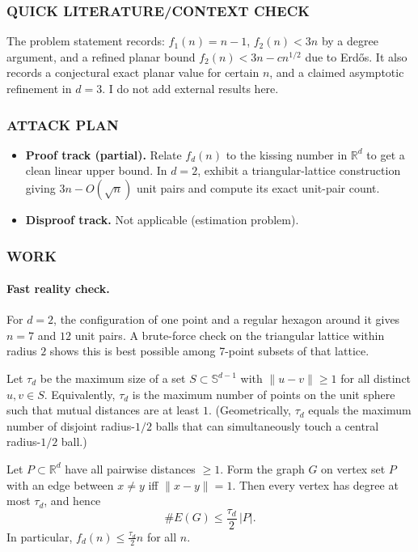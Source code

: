 \subsubsection*{QUICK LITERATURE/CONTEXT CHECK}
The problem statement records: \(f_1(n)=n-1\), \(f_2(n)<3n\) by a degree argument, and a refined planar bound
\(f_2(n)<3n-c n^{1/2}\) due to Erd\H{o}s. It also records a conjectural exact planar value for certain \(n\), and a claimed asymptotic refinement in \(d=3\).
I do not add external results here.

\subsubsection*{ATTACK PLAN}
\begin{itemize}
\item \textbf{Proof track (partial).} Relate \(f_d(n)\) to the kissing number in \(\mathbb{R}^d\) to get a clean linear upper bound. In \(d=2\), exhibit a triangular-lattice construction giving \(3n-O(\sqrt n)\) unit pairs and compute its exact unit-pair count.
\item \textbf{Disproof track.} Not applicable (estimation problem).
\end{itemize}

\subsubsection*{WORK}

\paragraph{Fast reality check.} For \(d=2\), the configuration of one point and a regular hexagon around it gives \(n=7\) and \(12\) unit pairs. A brute-force check on the triangular lattice within radius \(2\) shows this is best possible among 7-point subsets of that lattice.

\begin{definition}
Let \(\tau_d\) be the maximum size of a set \(S\subset \mathbb{S}^{d-1}\) with \(\|u-v\|\ge 1\) for all distinct \(u,v\in S\).
Equivalently, \(\tau_d\) is the maximum number of points on the unit sphere such that mutual distances are at least \(1\).
(Geometrically, \(\tau_d\) equals the maximum number of disjoint radius-\(1/2\) balls that can simultaneously touch a central radius-\(1/2\) ball.)
\end{definition}

\begin{lemma}
Let \(P\subset\mathbb{R}^d\) have all pairwise distances \(\ge 1\). Form the graph \(G\) on vertex set \(P\) with an edge between \(x\ne y\) iff \(\|x-y\|=1\). Then every vertex has degree at most \(\tau_d\), and hence
\[
\#E(G)\le \frac{\tau_d}{2}\,|P|.
\]
In particular, \(f_d(n)\le \frac{\tau_d}{2}n\) for all \(n\).
\end{lemma}

